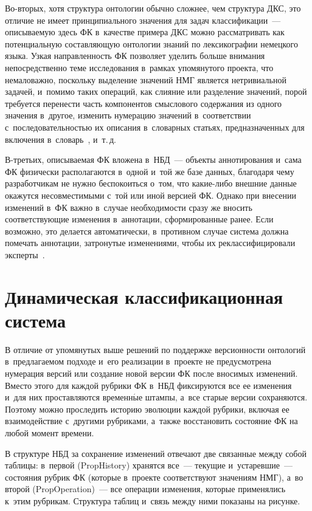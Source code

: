 \begin{multicols}{2}
Во-вто\-рых, хотя структура онтологии обычно сложнее, чем структура ДКС, 
это отличие не имеет принципиального значения для задач  
классификации~--- описываемую здесь ФК в~качестве примера ДКС можно 
рассматривать как потенциальную составляющую онтологии знаний по 
лексикографии немецкого языка. Узкая направленность ФК позволяет 
уделить больше внимания непосредственно теме исследования в~рамках 
упомянутого проекта, что немаловажно, поскольку выделение значений НМГ 
является нетривиальной задачей, и~помимо таких операций, как слияние или 
разделение значений, порой требуется перенести часть компонентов 
смыслового содержания из одного значения в~другое, изменить нумерацию 
значений в~соответствии с~последовательностью их описания в~словарных 
статьях, предназначенных для включения в~словарь~\cite{17-gon}, и~т.\,д.

В-третьих, описываемая ФК вложена в~НБД~--- объекты аннотирования 
и~сама ФК физически располагаются в~одной и~той же базе данных, 
благодаря чему разработчикам не нужно беспокоиться о~том, что  
ка\-кие-ли\-бо внешние данные окажутся не\-со\-вмес\-ти\-мы\-ми с~той или иной 
версией ФК. Однако при внесении изменений в~ФК важно в~случае 
необходимости сразу же вносить соответствующие изменения в~аннотации, 
сформированные ранее. Если возможно, это делается автоматически, 
в~противном случае система должна помечать аннотации, затронутые 
изменениями, чтобы их реклассифицировали эксперты~\cite{3-gon}.

\vspace*{-9pt}

\section{Динамическая классификационная система}

\vspace*{-2pt}

В отличие от упомянутых выше решений по поддержке версионности 
онтологий в~предлагаемом подходе и~его реализации в~проекте не 
предусмот\-ре\-на нумерация версий или создание новой версии ФК после 
вносимых изменений. Вместо этого для каждой рубрики ФК в~НБД 
фиксируются все ее изменения и~для них проставляются временн$\acute{\mbox{ы}}$е штампы, 
а~все старые версии сохраняются. Поэтому можно проследить историю 
эволюции каждой рубрики, включая ее взаимодействие с~другими 
руб\-ри\-ка\-ми, а~также восстановить состояние ФК на любой момент времени.

В структуре НБД за сохранение изменений отвечают две связанные между 
собой таблицы: в~первой (PropHistory) хранятся все~--- текущие 
и~устаревшие~--- состояния рубрик ФК (которые в~проекте соответствуют 
значениям НМГ), а~во второй (\mbox{PropOperation})~--- все операции изменения, 
которые применялись к~этим рубрикам. Структура таблиц и~связь между 
ними показаны на рисунке.




\end{multicols}

